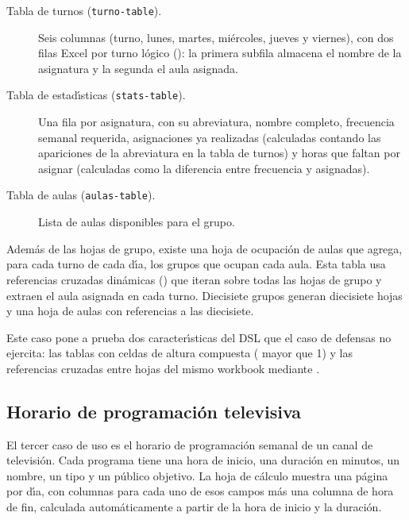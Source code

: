 \begin{description}
  \item[Tabla de turnos (\texttt{turno-table}).] Seis columnas (turno,
    lunes, martes, mi\'ercoles, jueves y viernes), con dos filas Excel por
    turno l\'ogico (): la primera subfila almacena el
    nombre de la asignatura y la segunda el aula asignada.

  \item[Tabla de estad\'{\i}sticas (\texttt{stats-table}).] Una fila por
    asignatura, con su abreviatura, nombre completo, frecuencia semanal
    requerida, asignaciones ya realizadas (calculadas contando las apariciones
    de la abreviatura en la tabla de turnos) y horas que faltan por asignar
    (calculadas como la diferencia entre frecuencia y asignadas).

  \item[Tabla de aulas (\texttt{aulas-table}).] Lista de aulas disponibles
    para el grupo.
\end{description}

Adem\'as de las hojas de grupo, existe una hoja de ocupaci\'on de aulas que
agrega, para cada turno de cada d\'{\i}a, los grupos que ocupan cada aula.
Esta tabla usa referencias cruzadas din\'amicas () que
iteran sobre todas las hojas de grupo y extraen el aula asignada en cada
turno.  Diecisiete grupos generan diecisiete hojas y una hoja de aulas con
referencias a las diecisiete.

Este caso pone a prueba dos caracter\'{\i}sticas del DSL que el caso de
defensas no ejercita: las tablas con celdas de altura compuesta
( mayor que 1) y las referencias cruzadas entre hojas del
mismo workbook mediante .

\subsection{Horario de programaci\'on televisiva}
\label{ssec:caso-tv}

El tercer caso de uso es el horario de programaci\'on semanal de un canal de
televisi\'on.  Cada programa tiene una hora de inicio, una duraci\'on en
minutos, un nombre, un tipo y un p\'ublico objetivo.  La hoja de c\'alculo
muestra una p\'agina por d\'{\i}a, con columnas para cada uno de esos campos
m\'as una columna de hora de fin, calculada autom\'aticamente a partir de la
hora de inicio y la duraci\'on.

